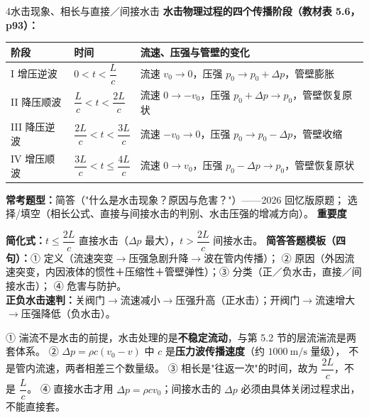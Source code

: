 \begin{kaodian}{4}{水击现象、相长与直接／间接水击}
\textbf{水击物理过程的四个传播阶段（教材表 5.6，p93）：}
\begin{center}
\begin{tabularx}{\textwidth}{@{}lXX@{}}
\toprule
阶段 & 时间 & 流速、压强与管壁的变化 \\
\midrule
I 增压逆波 & $0<t<\dfrac{L}{c}$ & 流速 $v_0\to0$，压强 $p_0\to p_0+\Delta p$，管壁膨胀 \\
II 降压顺波 & $\dfrac{L}{c}<t<\dfrac{2L}{c}$ & 流速 $0\to-v_0$，压强 $p_0+\Delta p\to p_0$，管壁恢复原状 \\
III 降压逆波 & $\dfrac{2L}{c}<t<\dfrac{3L}{c}$ & 流速 $-v_0\to0$，压强 $p_0\to p_0-\Delta p$，管壁收缩 \\
IV 增压顺波 & $\dfrac{3L}{c}<t\le\dfrac{4L}{c}$ & 流速 $0\to v_0$，压强 $p_0-\Delta p\to p_0$，管壁恢复原状 \\
\bottomrule
\end{tabularx}
\end{center}

\textbf{常考题型：}简答（"什么是水击现象？原因与危害？"）——2026 回忆版原题；
选择/填空（相长公式、直接与间接水击的判别、水击压强的增减方向）。
\textbf{重要度 }\quad{}\quad{}

\begin{banfa}
\textbf{简化式：}$t\le\dfrac{2L}{c}$ 直接水击（$\Delta p$ 最大），$t>\dfrac{2L}{c}$ 间接水击。
\textbf{简答答题模板（四句）：}① 定义（流速突变$\to$压强急剧升降$\to$波在管内传播）；
② 原因（外因流速突变，内因液体的惯性＋压缩性＋管壁弹性）；③ 分类（正／负水击，直接／间接水击）；
④ 危害与防护。\\
\textbf{正负水击速判：}关阀门$\to$流速减小$\to$压强升高（正水击）；开阀门$\to$流速增大$\to$压强降低（负水击）。
\end{banfa}

\begin{yicuo}
① 湍流不是水击的前提，水击处理的是\textbf{不稳定流动}，与第 5.2 节的层流湍流是两套体系。
② $\Delta p=\rho c(v_0-v)$ 中 $c$ 是\textbf{压力波传播速度}（约 $1000\ \mathrm{m/s}$ 量级），
不是管内流速，两者相差三个数量级。
③ 相长是"往返一次"的时间，故为 $\dfrac{2L}{c}$，不是 $\dfrac{L}{c}$。
④ 直接水击才用 $\Delta p=\rho c v_0$；间接水击的 $\Delta p$ 必须由具体关闭过程求出，不能直接套。
\end{yicuo}
\end{kaodian}

